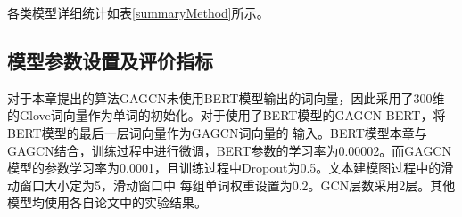各类模型详细统计如表\ref{summaryMethod}所示。
\begin{table}[htb]
	\centering
	\caption{算法模型统计}
\end{table}

\subsection{模型参数设置及评价指标}
对于本章提出的算法GAGCN未使用BERT模型输出的词向量，因此采用了300维的Glove词向量作为单词的初始化。对于使用了BERT模型的GAGCN-BERT，将BERT模型的最后一层词向量作为GAGCN词向量的
输入。BERT模型本章与GAGCN结合，训练过程中进行微调，BERT参数的学习率为0.00002。而GAGCN模型的参数学习率为0.0001，且训练过程中Dropout为0.5。文本建模图过程中的滑动窗口大小定为5，滑动窗口中
每组单词权重设置为0.2。GCN层数采用2层。其他模型均使用各自论文中的实验结果。


